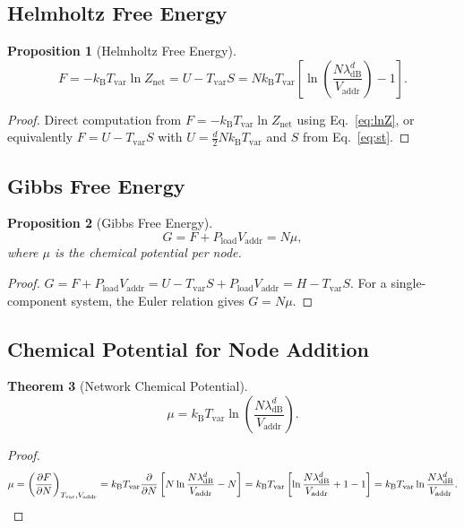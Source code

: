 \documentclass[11pt,twocolumn,a4paper]{article}
\newtheorem{theorem}{Theorem}[section]
\newtheorem{proposition}[theorem]{Proposition}
\theoremstyle{definition}
\theoremstyle{remark}
\newcommand{\kB}{k_{\mathrm{B}}}
\newcommand{\Tvar}{T_{\mathrm{var}}}
\newcommand{\Pload}{P_{\mathrm{load}}}
\newcommand{\Vaddr}{V_{\mathrm{addr}}}
\newcommand{\Znet}{Z_{\mathrm{net}}}
\newcommand{\dB}{\lambda_{\mathrm{dB}}}
\newcommand{\pder}[2]{\frac{\partial #1}{\partial #2}}
\begin{document}
\subsection{Helmholtz Free Energy}\label{sec:helmholtz}

\begin{proposition}[Helmholtz Free Energy]\label{prop:helmholtz}
\begin{equation}\label{eq:helmholtz}
  F = -\kB\Tvar\ln\Znet = U - \Tvar S
  = N\kB\Tvar\left[\ln\!\left(\frac{N\dB^d}{\Vaddr}\right)-1\right].
\end{equation}
\end{proposition}

\begin{proof}
Direct computation from $F=-\kB\Tvar\ln\Znet$ using Eq.~\eqref{eq:lnZ},
or equivalently $F=U-\Tvar S$ with $U=\frac{d}{2}N\kB\Tvar$ and $S$ from
Eq.~\eqref{eq:st}.
\end{proof}

\subsection{Gibbs Free Energy}\label{sec:gibbs}

\begin{proposition}[Gibbs Free Energy]\label{prop:gibbs}
\begin{equation}\label{eq:gibbs}
  G = F + \Pload\Vaddr = N\mu,
\end{equation}
where $\mu$ is the chemical potential per node.
\end{proposition}

\begin{proof}
$G=F+\Pload\Vaddr=U-\Tvar S+\Pload\Vaddr=H-\Tvar S$.
For a single-component system, the Euler relation gives $G=N\mu$.
\end{proof}

\subsection{Chemical Potential for Node Addition}\label{sec:chemical}

\begin{theorem}[Network Chemical Potential]\label{thm:chemical}
\begin{equation}\label{eq:chemical}
  \mu = \kB\Tvar\ln\!\left(\frac{N\dB^d}{\Vaddr}\right).
\end{equation}
\end{theorem}

\begin{proof}
\[
  \mu = \left(\pder{F}{N}\right)_{\Tvar,\Vaddr}
  = \kB\Tvar\pder{}{N}\left[N\ln\frac{N\dB^d}{\Vaddr}-N\right]
  = \kB\Tvar\left[\ln\frac{N\dB^d}{\Vaddr}+1-1\right]
  = \kB\Tvar\ln\frac{N\dB^d}{\Vaddr}.\qedhere
\]
\end{proof}
\end{document}
